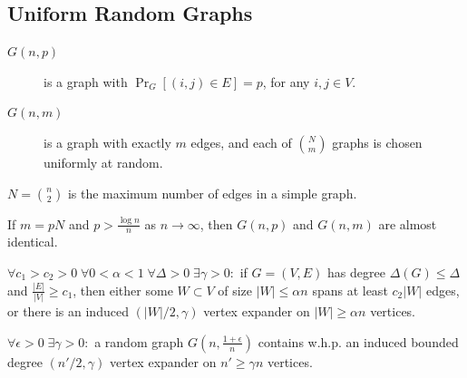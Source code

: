 \documentclass{beamer}
\newcommand{\autotitle}{\secname\ifdefempty{\subsecname}{}{~--- \subsecname}}
\begin{document}
\subsection{Uniform Random Graphs}

\begin{frame}{\autotitle}
    \begin{description}
        \item[$G(n,p)$] is a graph with $\Pr_G[(i,j)\in E]=p$, for any $i,j\in V$.
        \item[$G(n,m)$] is a graph with exactly $m$ edges,
        and each of $\binom{N}{m}$ graphs is chosen uniformly at random.
    \end{description}
    $N=\binom{n}{2}$ is the maximum number of edges in a simple graph.
    
    If $m=pN$ and $p>\frac{\log n}{n}$ as $n\to\infty$,
    then $G(n,p)$ and $G(n,m)$ are almost identical.
\end{frame}

\begin{frame}{\autotitle}
    \begin{theorem}
        $\forall c_1>c_2>0\;\forall 0<\alpha<1\;\forall\Delta>0\;\exists\gamma>0:$
        if $G=(V,E)$ has degree $\Delta(G)\leq\Delta$ and $\frac{|E|}{|V|}\geq c_1$,
        then either some $W\subset V$ of size $|W|\leq\alpha n$ spans at least $c_2|W|$ edges,
        or there is an induced $(|W|/2,\gamma)$ vertex expander on $|W|\geq\alpha n$ vertices.
    \end{theorem}
    
    \begin{corollary}
        $\forall\epsilon>0\;\exists\gamma>0:$ a random graph $G\left(n,\frac{1+\epsilon}{n}\right)$
        contains w.h.p. an induced bounded degree $(n'/2,\gamma)$ vertex expander
        on $n'\geq\gamma n$ vertices.
    \end{corollary}
\end{frame}
\end{document}

